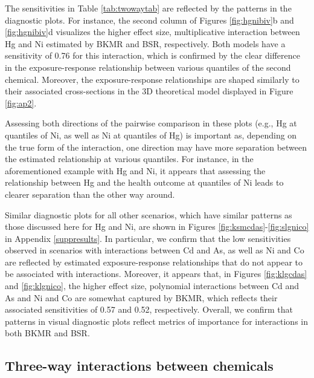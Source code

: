 \documentclass[12pt, twoside]{amherstthesis}
\begin{document}
The sensitivities in Table \ref{tab:twowaytab} are reflected by the patterns in the diagnostic plots. For instance, the second column of Figures \ref{fig:hgnibiv}b and \ref{fig:hgnibiv}d visualizes the higher effect size, multiplicative interaction between Hg and Ni estimated by BKMR and BSR, respectively. Both models have a sensitivity of 0.76 for this interaction, which is confirmed by the clear difference in the exposure-response relationship between various quantiles of the second chemical. Moreover, the exposure-response relationships are shaped similarly to their associated cross-sections in the 3D theoretical model displayed in Figure \ref{fig:ap2}.

Assessing both directions of the pairwise comparison in these plots (e.g., Hg at quantiles of Ni, as well as Ni at quantiles of Hg) is important as, depending on the true form of the interaction, one direction may have more separation between the estimated relationship at various quantiles. For instance, in the aforementioned example with Hg and Ni, it appears that assessing the relationship between Hg and the health outcome at quantiles of Ni leads to clearer separation than the other way around.

Similar diagnostic plots for all other scenarios, which have similar patterns as those discussed here for Hg and Ni, are shown in Figures \ref{fig:ksmcdas}-\ref{fig:slgnico} in Appendix \ref{suppresults}. In particular, we confirm that the low sensitivities observed in scenarios with interactions between Cd and As, as well as Ni and Co are reflected by estimated exposure-response relationships that do not appear to be associated with interactions. Moreover, it appears that, in Figures \ref{fig:klgcdas} and \ref{fig:klgnico}, the higher effect size, polynomial interactions between Cd and As and Ni and Co are somewhat captured by BKMR, which reflects their associated sensitivities of 0.57 and 0.52, respectively. Overall, we confirm that patterns in visual diagnostic plots reflect metrics of importance for interactions in both BKMR and BSR.

\hypertarget{three-way-interactions-between-chemicals}{%
\subsection{Three-way interactions between chemicals}\label{three-way-interactions-between-chemicals}}
\end{document}
